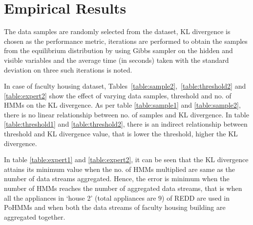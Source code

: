\documentclass{acm_proc_article-sp}
\begin{document}
\section{Empirical Results} 
\label{App:AppendixA}

The data samples are randomly selected from the dataset, KL divergence is chosen as the performance metric, iterations are performed to obtain the samples from the equilibrium distribution by using Gibbs sampler on the hidden and visible variables and the average time (in seconds) taken with the standard deviation on three such iterations is noted.

In case of faculty housing dataset, Tables~\ref{table:sample2},~\ref{table:threshold2} and \ref{table:expert2} show the effect of varying data samples, threshold and no. of HMMs on the KL divergence.
As per table \ref{table:sample1} and \ref{table:sample2}, there is no linear relationship between no. of samples and KL divergence. 
In table \ref{table:threshold1} and \ref{table:threshold2}, there is an indirect relationship between threshold and KL divergence value, that is lower the threshold, higher the KL divergence. 

In table \ref{table:expert1} and \ref{table:expert2}, it can be seen that the KL divergence attains its minimum value when the no. of HMMs multiplied are same as the number of data streams aggregated. Hence, the error is minimum 
when the number of HMMs reaches the number of aggregated data streams, that is when all the appliances in `house 2' (total appliances are $9$) of REDD are used in PoHMMs and when both the data streams of faculty housing building are aggregated together.

\end{document}
